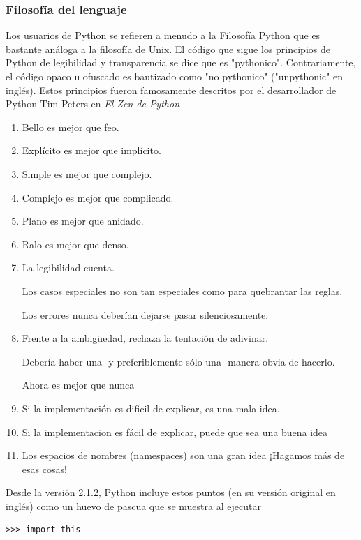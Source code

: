 \documentclass[a4paper]{report}
\begin{document}
\subsubsection*{Filosofía del lenguaje}

Los usuarios de Python se refieren a menudo a la Filosofía Python que es
bastante análoga a la filosofía de Unix. El código que sigue los principios de
Python de legibilidad y transparencia se dice que es "pythonico".
Contrariamente, el código opaco u ofuscado es bautizado como "no pythonico"
("unpythonic" en inglés). Estos principios fueron famosamente descritos por el
desarrollador de Python Tim Peters en \emph{El Zen de Python}

\begin{enumerate}
  \item Bello es mejor que feo.
  \item Explícito es mejor que implícito.
  \item Simple es mejor que complejo.
  \item Complejo es mejor que complicado.
  \item Plano es mejor que anidado.
  \item Ralo es mejor que denso.
  \item La legibilidad cuenta.
  \begin{item}
    Los casos especiales no son tan especiales como para quebrantar las reglas.
  \end{item}
  \begin{item}
    Los errores nunca deberían dejarse pasar silenciosamente.
  \end{item}
  \item {Frente a la ambigüedad, rechaza la tentación de adivinar.}
  \begin{item}
    Debería haber una -y preferiblemente sólo una- manera obvia de hacerlo. 
  \end{item}
  \begin{item}
    Ahora es mejor que nunca
  \end{item}
  \item {Si la implementación es dificil de explicar, es una mala idea.}
  \item {Si la implementacion es fácil de explicar, puede que sea una buena idea}
  \item {Los espacios de nombres (namespaces) son una gran idea ¡Hagamos más de esas cosas!}
  \end{enumerate}
  Desde la versión 2.1.2, Python incluye estos puntos (en su versión original en inglés) 
  como un huevo de pascua que se muestra al ejecutar 
\begin{lstlisting}[style=consola]
>>> import this
\end{lstlisting}
\end{document}

